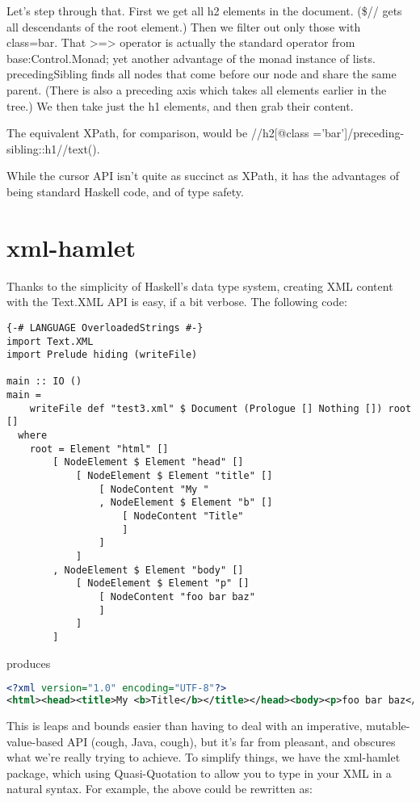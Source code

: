 Let's step through that. First we get all h2 elements in the document. (\$// gets all descendants of the root element.) Then we filter out only those with class=bar. That >=> operator is actually the standard operator from base:Control.Monad; yet another advantage of the monad instance of lists. precedingSibling finds all nodes that come before our node and share the same parent. (There is also a preceding axis which takes all elements earlier in the tree.) We then take just the h1 elements, and then grab their content.

\begin{remark}
The equivalent XPath, for comparison, would be //h2[@class ='bar']/preceding-sibling::h1//text().
\end{remark}

While the cursor API isn't quite as succinct as XPath, it has the advantages of being standard Haskell code, and of type safety.

\section{xml-hamlet}

Thanks to the simplicity of Haskell's data type system, creating XML content with the Text.XML API is easy, if a bit verbose. The following code:

\begin{lstlisting}
{-# LANGUAGE OverloadedStrings #-}
import Text.XML
import Prelude hiding (writeFile)

main :: IO ()
main =
    writeFile def "test3.xml" $ Document (Prologue [] Nothing []) root []
  where
    root = Element "html" []
        [ NodeElement $ Element "head" []
            [ NodeElement $ Element "title" []
                [ NodeContent "My "
                , NodeElement $ Element "b" []
                    [ NodeContent "Title"
                    ]
                ]
            ]
        , NodeElement $ Element "body" []
            [ NodeElement $ Element "p" []
                [ NodeContent "foo bar baz"
                ]
            ]
        ]
\end{lstlisting}

produces

\begin{lstlisting}[language=XML]
<?xml version="1.0" encoding="UTF-8"?>
<html><head><title>My <b>Title</b></title></head><body><p>foo bar baz</p></body></html>
\end{lstlisting}

This is leaps and bounds easier than having to deal with an imperative, mutable-value-based API (cough, Java, cough), but it's far from pleasant, and obscures what we're really trying to achieve. To simplify things, we have the xml-hamlet package, which using Quasi-Quotation to allow you to type in your XML in a natural syntax. For example, the above could be rewritten as:

